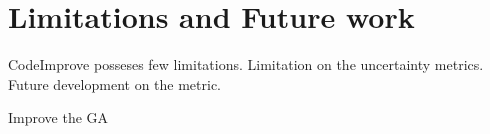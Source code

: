
\section{Limitations and Future work}
\label{limitations}

CodeImprove posseses few limitations. Limitation on the uncertainty metrics. Future development on the metric. 

Improve the GA 

